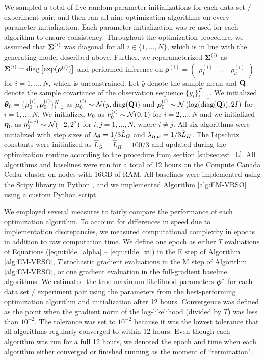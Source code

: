 We sampled a total of five random parameter initializations for each data set / experiment pair, and then ran all nine optimization algorithms on every parameter initialization. Each parameter initialization was re-used for each algorithm to ensure consistency. Throughout the optimization procedure, we assumed that $\boldsymbol{\Sigma}^{(i)}$ was diagonal for all $i \in \{1,\ldots,N\}$, which is in line with the generating model described above. Further, we reparameterized $\boldsymbol{\Sigma}^{(i)}$ as 
%
$\boldsymbol{\Sigma}^{(i)} = \text{diag}\left[\exp(\boldsymbol{\rho}^{(i)})\right]$
%
and performed inference on $\boldsymbol{\rho}^{(i)} = \begin{pmatrix} \rho^{(i)}_1 & \ldots & \rho^{(i)}_d \end{pmatrix}$ for $i = 1,\ldots,N$, which is unconstrained. 
%
Let $\bar y$ denote the sample mean and $\mathbf{Q}$ denote the sample covariance of the observation sequence $\{y_t\}_{t=1}^T$. We initialized $\boldsymbol{\theta}_0 = \{\mu^{(i)}_0,\boldsymbol{\rho}^{(i)}_0\}_{i=1}^N$ as
%
$\mu^{(i)}_0 \sim \mathcal{N}(\bar y, \text{diag}(\mathbf{Q}))$ and $\boldsymbol{\rho}^{(i)}_0 \sim \mathcal{N}\left(\log(\text{diag}(\mathbf{Q})), 2I \right)$ for $i = 1,\ldots,N$.
%
We initialized $\boldsymbol{\nu}_0$ as
%
$\nu^{(i)}_0 \sim \mathcal{N}(0,1)$ for $i = 2,\ldots,N$ and we initialized $\boldsymbol{\eta}_0$ as
%
$\eta^{(i,j)}_0 \sim \mathcal{N}(-2,2^2)$ for $i,j = 1,\ldots,N$, where $i \neq j$.
%
All six algorithms were initialized with step sizes of $\lambda_{\boldsymbol{\theta}} = 1/3 \hat L_G$ and $\lambda_{\boldsymbol{\eta},\boldsymbol{\nu}} = 1/3 \hat L_H$. The Lipschitz constants were initialized as $\hat L_G = \hat L_H = 100/3$ and updated during the optimization routine according to the procedure from section \ref{subsec:est_L}. 
%
All algorithms and baselines were run for a total of 12 hours on the Compute Canada Cedar cluster on nodes with 16GB of RAM.
%
All baselines were implemented using the Scipy library in Python \citep{Virtanen:2019}, and we implemented Algorithm \ref{alg:EM-VRSO} using a custom Python script.

We employed several measures to fairly compare the performance of each optimization algorithm. To account for differences in speed due to implementation discrepancies, we measured computational complexity in epochs in addition to raw computation time. We define one epoch as either $T$ evaluations of Equations (\ref{eqn:tilde_alpha} -- \ref{eqn:tilde_xi}) in the E step of Algorithm \ref{alg:EM-VRSO}, $T$ stochastic gradient evaluations in the M step of Algorithm \ref{alg:EM-VRSO}, or one gradient evaluation in the full-gradient baseline algorithms. We estimated the true maximum likelihood parameters $\boldsymbol{\phi}^*$ for each data set / experiment pair using the parameters from the best-performing optimization algorithm and initialization after 12 hours. Convergence was defined as the point when the gradient norm of the log-likelihood (divided by $T$) was less than $10^{-2}$. The tolerance was set to $10^{-2}$ because it was the lowest tolerance that all algorithms regularly converged to within 12 hours. Even though each algorithm was run for a full 12 hours, we denoted the epoch and time when each algorithm either converged or finished running as the moment of ``termination".

